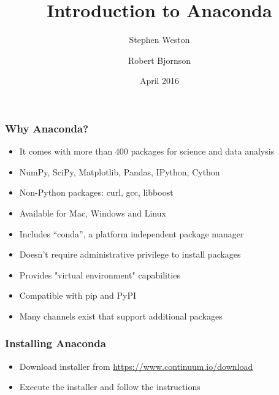 \documentclass[10pt]{beamer}
\title{Introduction to Anaconda}
\author{{Stephen Weston} \and {Robert Bjornson}}
\institute[Yale]{
  Yale Center for Research Computing \\
  Yale University
}
\date{April 2016}
\begin{document}
\begin{frame}[plain]
  \titlepage
\end{frame}

\begin{frame}
\frametitle{Why Anaconda?}

\begin{itemize}
\item It comes with more than 400 packages for science and data analysis
\item NumPy, SciPy, Matplotlib, Pandas, IPython, Cython
\item Non-Python packages: curl, gcc, libboost
\item Available for Mac, Windows and Linux
\item Includes ``conda'', a platform independent package manager
\item Doesn't require administrative privilege to install packages
\item Provides "virtual environment" capabilities
\item Compatible with pip and PyPI
\item Many channels exist that support additional packages
\end{itemize}
\end{frame}

\begin{frame}
\frametitle{Installing Anaconda}

\begin{itemize}
\item Download installer from \url{https://www.continuum.io/download}
\item Execute the installer and follow the instructions
\end{itemize}
\end{frame}
\end{document}
